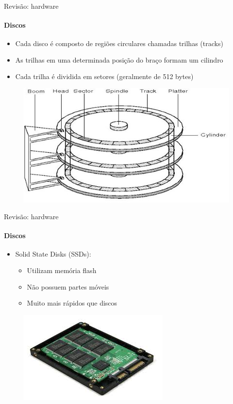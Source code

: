 \documentclass{beamer}
\begin{document}
\begin{frame}{Revisão: hardware}
	\framesubtitle{Discos}
	\begin{itemize}
		\item Cada disco é composto de regiões circulares chamadas \alert{trilhas (tracks)}
		\item As trilhas em uma determinada posição do braço formam um \alert{cilindro}
		\item Cada trilha é dividida em \alert{setores} (geralmente de 512 bytes)
		
	\end{itemize}
	\begin{figure}
		\includegraphics[width=0.5\paperwidth]{resources/cylinder}
	\end{figure}
\end{frame}
\begin{frame}{Revisão: hardware}
	\framesubtitle{Discos}
	\begin{itemize}
		\item Solid State Disks (SSDs):
		\begin{itemize}
			\item Utilizam memória flash
			\item Não possuem partes móveis
			\item Muito mais rápidos que discos
		\end{itemize}
	\end{itemize}
	\begin{figure}
		\includegraphics[width=0.5\paperwidth]{resources/ssd}
	\end{figure}
\end{frame}
\end{document}
